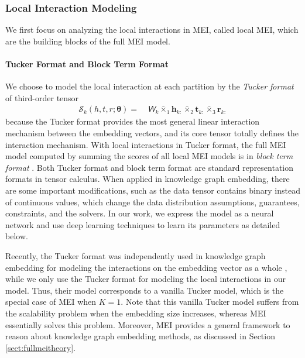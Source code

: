 \documentclass{ecai}
\def\vh{{\bm{h}}}
\def\vr{{\bm{r}}}
\def\vt{{\bm{t}}}
\newcommand{\tens}[1]{\bm{\mathsfit{#1}}}
\def\tW{{\tens{W}}}
\def\gS{{\mathcal{S}}}
\theoremstyle{plain}  \newtheorem{thm}{Theorem}  \newtheorem{lem}[thm]{Lemma}  \newtheorem{prop}[thm]{Proposition}
\theoremstyle{remark}  \newtheorem*{rem}{Remark}
\begin{document}
\subsubsection{Local Interaction Modeling} \label{sect:localtheory}
We first focus on analyzing the local interactions in MEI, called local MEI, which are the building blocks of the full MEI model.

\paragraph{Tucker Format and Block Term Format}
We choose to model the local interaction at each partition by the \textit{Tucker format} \cite{tucker_mathematicalnotesthreemode_1966} of third-order tensor
\begin{align}
\gS_k (h,t,r;\bm{\theta}) =\ &\tW_k \bar{\times}_1 \vh_{k:} \bar{\times}_2 \vt_{k:} \bar{\times}_3 \vr_{k:} \label{eq:scoremeitensorproductatk}
\end{align}
because the Tucker format provides the most general linear interaction mechanism between the embedding vectors, and its core tensor totally defines the interaction mechanism. With local interactions in Tucker format, the full MEI model computed by summing the scores of all local MEI models is in \textit{block term format} \cite{delathauwer_decompositionshigherordertensor_2008a}. Both Tucker format and block term format are standard representation formats in tensor calculus. When applied in knowledge graph embedding, there are some important modifications, such as the data tensor contains binary instead of continuous values, which change the data distribution assumptions, guarantees, constraints, and the solvers. In our work, we express the model as a neural network and use deep learning techniques to learn its parameters as detailed below.

Recently, the Tucker format was independently used in knowledge graph embedding for modeling the interactions on the embedding vector as a whole \cite{balazevic_tuckertensorfactorization_2019}, while we only use the Tucker format for modeling the local interactions in our model. Thus, their model corresponds to a vanilla Tucker model, which is the special case of MEI when $ K = 1 $. Note that this vanilla Tucker model suffers from the scalability problem when the embedding size increases, whereas MEI essentially solves this problem. Moreover, MEI provides a general framework to reason about knowledge graph embedding methods, as discussed in Section \ref{sect:fullmeitheory}.
\end{document}

